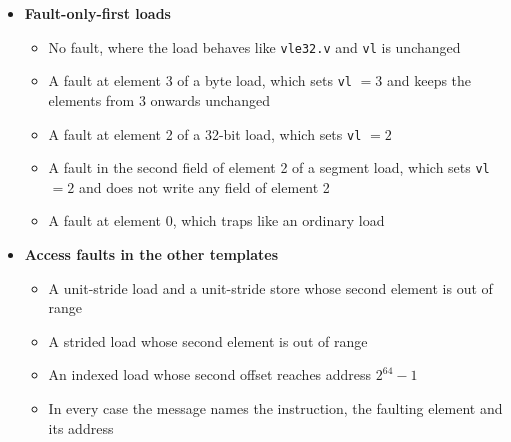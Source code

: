 \documentclass[11pt,a4paper]{article}
\begin{document}
\begin{itemize}
    \item \textbf{Fault-only-first loads}
    \begin{itemize}
        \item No fault, where the load behaves like \texttt{vle32.v} and \texttt{vl} is unchanged
        \item A fault at element 3 of a byte load, which sets \texttt{vl} $= 3$ and keeps the
              elements from 3 onwards unchanged
        \item A fault at element 2 of a 32-bit load, which sets \texttt{vl} $= 2$
        \item A fault in the second field of element 2 of a segment load, which sets
              \texttt{vl} $= 2$ and does not write any field of element 2
        \item A fault at element 0, which traps like an ordinary load
    \end{itemize}

    \item \textbf{Access faults in the other templates}
    \begin{itemize}
        \item A unit-stride load and a unit-stride store whose second element is out of range
        \item A strided load whose second element is out of range
        \item An indexed load whose second offset reaches address $2^{64} - 1$
        \item In every case the message names the instruction, the faulting element and its
              address
    \end{itemize}
\end{itemize}
\end{document}
